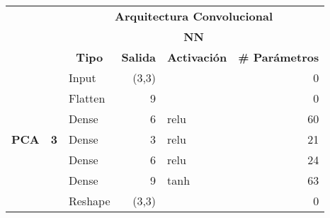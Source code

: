 \begin{table}[]
\centering
\begin{center}
\begin{tabular}{ll|l|r|l|r|}
\cline{3-6}
                                                    &                             & \multicolumn{4}{c|}{\textbf{Arquitectura Convolucional}}                                                                                                           \\ \cline{3-6} 
                                                    &                             & \multicolumn{4}{c|}{\textbf{NN}}                                                                                                                                   \\ \cline{3-6} 
                                                    &                             & \multicolumn{1}{c|}{\textbf{Tipo}} & \multicolumn{1}{c|}{\textbf{Salida}} & \multicolumn{1}{c|}{\textbf{Activaci\'{o}n}} & \multicolumn{1}{l|}{\textbf{\# Par\'{a}metros}} \\ \hline
\multicolumn{1}{|l|}{\multirow{7}{*}{\textbf{PCA}}} & \multirow{7}{*}{\textbf{3}} & Input                              & (3,3)                                &                      & 0                                           \\ \cline{3-6} 
\multicolumn{1}{|l|}{}                              &                             & Flatten                            & 9                                    &                                          & 0                                           \\ \cline{3-6} 
\multicolumn{1}{|l|}{}                              &                             & Dense                              & 6                                    & relu                                     & 60                                          \\ \cline{3-6} 
\multicolumn{1}{|l|}{}                              &                             & Dense                              & 3                                    & relu                                     & 21                                          \\ \cline{3-6} 
\multicolumn{1}{|l|}{}                              &                             & Dense                              & 6                                    & relu                                     & 24                                          \\ \cline{3-6} 
\multicolumn{1}{|l|}{}                              &                             & Dense                              & 9                                    & tanh                                     & 63                                          \\ \cline{3-6} 
\multicolumn{1}{|l|}{}                              &                             & Reshape                            & (3,3)                                &                                          & 0                                           \\ \hline


\end{tabular}
\end{center}
\end{table}
